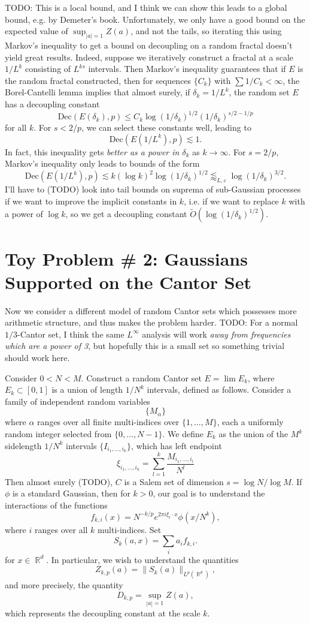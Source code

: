 \documentclass[dvipsnames,letterpaper,12pt]{article}
\numberwithin{equation}{section}
\DeclareMathOperator{\RR}{\mathbb{R}}
\numberwithin{theorem}{section}
\begin{document}
TODO: This is a local bound, and I think we can show this leads to a global bound, e.g. by Demeter's book. Unfortunately, we only have a good bound on the expected value of $\sup_{|a| = 1} Z(a)$, and not the tails, so iterating this using Markov's inequality to get a bound on decoupling on a random fractal doesn't yield great results. Indeed, suppose we iteratively construct a fractal at a scale $1/L^k$ consisting of $L^{ks}$ intervals. Then Markov's inequality guarantees that if $E$ is the random fractal constructed, then for sequences $\{ C_k \}$ with $\sum 1/C_k < \infty$, the Borel-Cantelli lemma implies that almost surely, if $\delta_k = 1/L^k$, the random set $E$ has a decoupling constant
%
\[ \text{Dec}(E(\delta_k),p) \leq C_k \log (1/\delta_k)^{1/2} (1/\delta_k)^{s/2 - 1/p} \]
%
for all $k$. For $s < 2/p$, we can select these constants well, leading to
%
\[ \text{Dec}(E(1/L^k),p) \lesssim 1. \]
%
In fact, this inequality gets \emph{better as a power in $\delta_k$} as $k \to \infty$. For $s = 2/p$, Markov's inequality only leads to bounds of the form
%
\[ \text{Dec}(E(1/L^k),p) \lesssim k (\log k)^2 \log(1/\delta_k)^{1/2} \lessapprox_{L,\varepsilon} \log(1/\delta_k)^{3/2}. \]
%
I'll have to (TODO) look into tail bounds on suprema of sub-Gaussian processes if we want to improve the implicit constants in $k$, i.e. if we want to replace $k$ with a power of $\log k$, so we get a decoupling constant $\widetilde{O}( \log(1/\delta_k)^{1/2})$.

\section{Toy Problem \# 2: Gaussians Supported on the Cantor Set}

Now we consider a different model of random Cantor sets which possesses more arithmetic structure, and thus makes the problem harder. TODO: For a normal $1/3$-Cantor set, I think the same $L^\infty$ analysis will work \emph{away from frequencies which are a power of 3}, but hopefully this is a small set so something trivial should work here.

Consider $0 < N < M$. Construct a random Cantor set $E = \lim E_k$, where $E_k \subset [0,1]$ is a union of length $1/N^k$ intervals, defined as follows. Consider a family of independent random variables
%
\[ \{ M_\alpha \} \]
%
where $\alpha$ ranges over all finite multi-indices over $\{ 1, \dots, M \}$, each a uniformly random integer selected from $\{ 0, \dots, N-1 \}$. We define $E_k$ as the union of the $M^k$ sidelength $1/N^k$ intervals $\{ I_{i_1,\dots,i_k} \}$, which has left endpoint
%
\[ \xi_{i_1, \dots, i_k} = \sum_{l = 1}^k \frac{M_{i_1, \dots, i_l}}{N^l} \]
%
Then almost surely (TODO), $C$ is a Salem set of dimension $s = \log N / \log M$. If $\phi$ is a standard Gaussian, then for $k > 0$, our goal is to understand the interactions of the functions
%
\[ f_{k,i}(x) = N^{-k/p} e^{2 \pi i \xi_i \cdot x} \phi(x/N^k), \]
%
where $i$ ranges over all $k$ multi-indices. Set
%
\[ S_k(a,x) = \sum_i a_i f_{k,i}. \]
%
for $x \in \RR^d$. In particular, we wish to understand the quantities
%
\[ Z_{k,p}(a) = \| S_k(a) \|_{L^p(\RR^d)}, \]
%
and more precisely, the quantity
%
\[ D_{k,p} = \sup_{|a| = 1} Z(a), \]
%
which represents the decoupling constant at the scale $k$.
\end{document}
